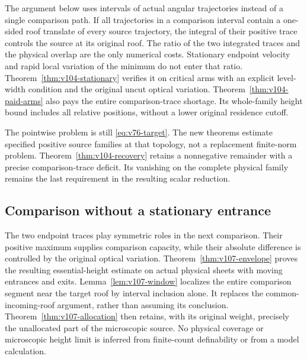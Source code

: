 \documentclass[11pt,reqno]{amsart}
\numberwithin{equation}{section}
\theoremstyle{definition}\newtheorem{definition}[theorem]{Definition}
\theoremstyle{remark}\newtheorem{remark}[theorem]{Remark}
\begin{document}
The argument below uses intervals of actual angular trajectories
instead of a single comparison path. If all trajectories in a
comparison interval contain a one-sided roof translate of every
source trajectory, the integral of their positive trace controls the
source at its original roof. The ratio of the two integrated traces
and the physical overlap are the only numerical costs. Stationary
endpoint velocity and rapid local variation of the minimum do not
enter that ratio. Theorem~\ref{thm:v104-stationary} verifies it on
critical arms with an explicit level-width condition and the original uncut optical variation. Theorem~\ref{thm:v104-paid-arms}
also pays the entire comparison-trace shortage. Its whole-family
height bound includes all
relative positions, without a lower original residence cutoff.

The pointwise problem is still \eqref{eq:v76-target}. The new
theorems estimate specified positive source families at that topology,
not a replacement finite-norm problem. Theorem~\ref{thm:v104-recovery}
retains a nonnegative remainder with a precise comparison-trace
deficit. Its vanishing on the complete physical family remains the
last requirement in the resulting scalar reduction.

\subsection{Comparison without a stationary entrance}
The two endpoint traces play symmetric roles in the next comparison.
Their positive maximum supplies comparison capacity, while their
absolute difference is controlled by the original optical variation.
Theorem~\ref{thm:v107-envelope} proves the resulting essential-height
estimate on actual physical sheets with moving entrances and exits.
Lemma~\ref{lem:v107-window} localizes the entire comparison segment
near the target roof by interval inclusion alone. It replaces the
common-incoming-roof argument, rather than assuming its conclusion.
Theorem~\ref{thm:v107-allocation} then retains, with its original
weight, precisely the unallocated part of the microscopic source.
No physical coverage or microscopic height limit is inferred from
finite-count definability or from a model calculation.
\end{document}
